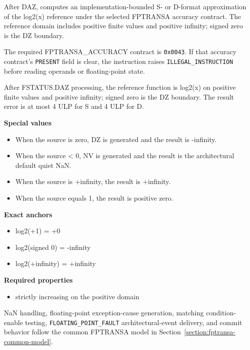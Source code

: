After DAZ, computes an implementation-bounded S- or D-format approximation of the log2(x) reference under the selected FPTRANSA accuracy contract. The reference domain includes positive finite values and positive infinity; signed zero is the DZ boundary.

The required FPTRANSA\_ACCURACY contract is \texttt{0x0043}. If that accuracy contract's \texttt{PRESENT} field is clear, the instruction raises \texttt{ILLEGAL\_INSTRUCTION} before reading operands or floating-point state.

After FSTATUS.DAZ processing, the reference function is log2(x) on positive finite values and positive infinity; signed zero is the DZ boundary. The result error is at most 4 ULP for S and 4 ULP for D.

\textbf{Special values}\par
\begin{itemize}
\item When the source is zero, DZ is generated and the result is -infinity.
\item When the source \textless{} 0, NV is generated and the result is the architectural default quiet NaN.
\item When the source is +infinity, the result is +infinity.
\item When the source equals 1, the result is positive zero.
\end{itemize}

\textbf{Exact anchors}\par
\begin{itemize}
\item log2(+1) = +0
\item log2(signed 0) = -infinity
\item log2(+infinity) = +infinity
\end{itemize}

\textbf{Required properties}\par
\begin{itemize}
\item strictly increasing on the positive domain
\end{itemize}

NaN handling, floating-point exception-cause generation, matching condition-enable testing, \texttt{FLOATING\_POINT\_FAULT} architectural-event delivery, and commit behavior follow the common FPTRANSA model in Section~\ref{section:fptransa-common-model}.
